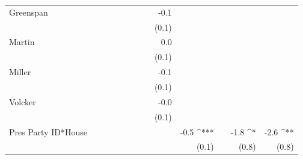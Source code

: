 \documentclass[a4paper]{article}\usepackage{graphicx, color}
\begin{document}
\begin{table}[ht]
\begin{center}
{\begin{tabular}{ l D{.}{.}{1}D{.}{.}{1}D{.}{.}{1}D{.}{.}{1}D{.}{.}{1}D{.}{.}{1}D{.}{.}{1}D{.}{.}{1}D{.}{.}{1}D{.}{.}{1}D{.}{.}{1}D{.}{.}{1} }
Greenspan            &                &                &                &                &                &                &                & -0.1           &                &                &                &               \\ 
                     &                &                &                &                &                &                &                & (0.1)          &                &                &                &               \\ 
Martin               &                &                &                &                &                &                &                & 0.0            &                &                &                &               \\ 
                     &                &                &                &                &                &                &                & (0.1)          &                &                &                &               \\ 
Miller               &                &                &                &                &                &                &                & -0.1           &                &                &                &               \\ 
                     &                &                &                &                &                &                &                & (0.1)          &                &                &                &               \\ 
Volcker              &                &                &                &                &                &                &                & -0.0           &                &                &                &               \\ 
                     &                &                &                &                &                &                &                & (0.1)          &                &                &                &               \\ 
Pres Party ID*House  &                &                &                &                &                &                &                &                & -0.5 ^{***}    &                & -1.8 ^*        & -2.6 ^{**}    \\ 
                     &                &                &                &                &                &                &                &                & (0.1)          &                & (0.8)          & (0.8)         \\ 

\end{tabular}}
\end{center}
\end{table}
\end{document}
